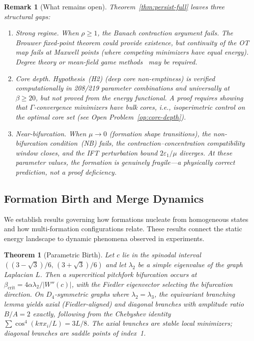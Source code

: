 \documentclass[lettersize,journal]{IEEEtran}
\newtheorem{theorem}{Theorem}
\newtheorem{remark}{Remark}
\begin{document}
\begin{remark}[What remains open]
\label{rmk:persist-open}
Theorem~\ref{thm:persist-full} leaves three structural gaps:
\begin{enumerate}
\item \emph{Strong regime.} When $\rho \geq 1$, the Banach contraction argument fails. The Brouwer fixed-point theorem could provide existence, but continuity of the OT map fails at Maxwell points (where competing minimizers have equal energy). Degree theory or mean-field game methods~\cite{LasryLions2007} may be required.
\item \emph{Core depth.} Hypothesis~(H2) (deep core non-emptiness) is verified computationally in 208/219 parameter combinations and universally at $\beta \geq 20$, but not proved from the energy functional. A proof requires showing that $\Gamma$-convergence minimizers have bulk cores, i.e., isoperimetric control on the optimal core set (see Open Problem~\ref{op:core-depth}).
\item \emph{Near-bifurcation.} When $\mu \to 0$ (formation shape transitions), the non-bifurcation condition~(NB) fails, the contraction--concentration compatibility window closes, and the IFT perturbation bound $2\varepsilon_1/\mu$ diverges. At these parameter values, the formation is genuinely fragile---a physically correct prediction, not a proof deficiency.
\end{enumerate}
\end{remark}

\subsection{Formation Birth and Merge Dynamics}
\label{sec:merge}

We establish results governing how formations nucleate from homogeneous states and how multi-formation configurations relate. These results connect the static energy landscape to dynamic phenomena observed in experiments.

\begin{theorem}[Parametric Birth]
\label{thm:parametric-birth}
Let $c$ lie in the spinodal interval $((3-\sqrt{3})/6,\,(3+\sqrt{3})/6)$ and let $\lambda_2$ be a simple eigenvalue of the graph Laplacian $L$. Then a supercritical pitchfork bifurcation occurs at $\beta_{\mathrm{crit}} = 4\alpha\lambda_2/|W''(c)|$, with the Fiedler eigenvector selecting the bifurcation direction. On $D_4$-symmetric graphs where $\lambda_2 = \lambda_3$, the equivariant branching lemma yields axial (Fiedler-aligned) and diagonal branches with amplitude ratio $B/A = 2$ exactly, following from the Chebyshev identity $\sum \cos^4(k\pi x_i/L) = 3L/8$. The axial branches are stable local minimizers; diagonal branches are saddle points of index~1.
\end{theorem}
\end{document}
